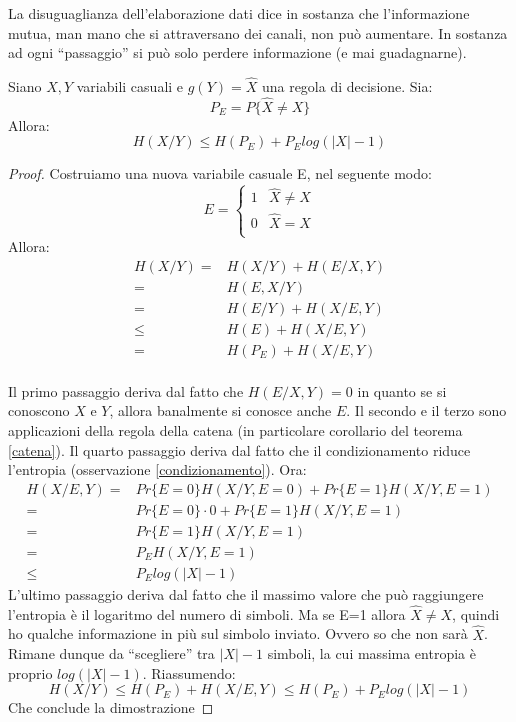\medskip

La disuguaglianza dell'elaborazione dati dice in sostanza che l'informazione mutua, man mano che si attraversano dei canali, 
non può aumentare. In sostanza ad ogni ``passaggio'' si può solo perdere informazione (e mai guadagnarne).

\bigskip

\begin{teorema}
\mbox{}

Siano $X,Y$ variabili casuali e $g(Y)=\widehat{X}$ una regola di decisione. Sia:
\[
 P_E=P\{\widehat{X} \neq X\}
\]
Allora:
\[
 H(X/Y) \le H(P_E)+P_E log(|X|-1)
\]
\begin{proof}
\mbox{}

 Costruiamo una nuova variabile casuale E, nel seguente modo:
 \[
  E=
  \begin{cases}
    1 & \widehat{X} \neq X \\
    0 & \widehat{X}=X \\
  \end{cases}
 \]
 Allora:
 \[\begin{split}
   H(X/Y)=&H(X/Y)+H(E/X,Y) \\
         =&H(E,X/Y) \\
         =&H(E/Y)+H(X/E,Y) \\
         \le & H(E) + H(X/E,Y) \\
         = & H(P_E) + H(X/E,Y) \\
   \end{split}
 \]

Il primo passaggio deriva dal fatto che $H(E/X,Y)=0$ in quanto se si conoscono $X$ e $Y$, allora banalmente si conosce anche $E$. 
Il secondo e il terzo sono applicazioni 
della regola della catena (in particolare corollario del teorema \ref{catena}). Il quarto passaggio 
deriva dal fatto che il condizionamento riduce l'entropia (osservazione \ref{condizionamento}).
Ora:
\[\begin{split}
 H(X/E,Y) =&Pr\{E=0\}H(X/Y,E=0)+
           Pr\{E=1\}H(X/Y,E=1) \\
          =&Pr\{E=0\} \cdot 0 + Pr\{E=1\}H(X/Y,E=1) \\
          =&Pr\{E=1\}H(X/Y,E=1) \\
          =&P_E H(X/Y,E=1) \\
          \le& P_E log(|X|-1)
  \end{split}
\]
L'ultimo passaggio deriva dal fatto che il massimo valore che può raggiungere l'entropia è il logaritmo del 
numero di simboli. Ma se E=1 allora $\widehat{X}\neq X$, quindi ho qualche informazione in più sul simbolo inviato. 
Ovvero so che non sarà $\widehat{X}$. Rimane dunque da ``scegliere'' tra $|X|-1$ simboli, la cui massima entropia è proprio 
$log(|X|-1)$.
Riassumendo:
\[
 H(X/Y) \le H(P_E) + H(X/E,Y) \le H(P_E)+P_E log(|X|-1)
\]
Che conclude la dimostrazione
\end{proof}
\end{teorema}


